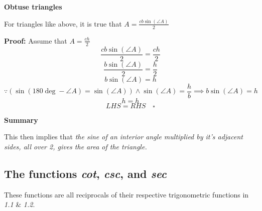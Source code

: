 \documentclass[a4paper, 12pt]{article}
\begin{document}
\begin{center}
	{\large \textbf{Obtuse triangles} } \bigbreak


\end{center}
For triangles like above, it is true that {\Large $A = \frac{cb\sin(\angle{A})}{2}$}

\begin{center}
	\textbf{Proof:}
	Assume that $A = \frac{ch}{2}$ \\
	$$\frac{cb\sin(\angle{A})}{2} = \frac{ch}{2}$$
	$$\frac{b\sin(\angle{A})}{2} = \frac{h}{2}$$
	$$b\sin(\angle{A}) = h$$
	$$\because (\sin(180\deg - \angle{A}) = \sin(\angle{A})) \land \sin(\angle{A}) = \frac{h}{b} \implies b\sin(\angle{A}) = h$$
	$$h = h$$
	$$LHS = RHS \quad \square$$
\end{center}
\newpage



{\large \textbf{Summary}} \bigbreak

This then implies that \emph{the sine of an interior angle multiplied by it's adjacent sides, all over 2, gives the area of the triangle.}

\subsection{The functions \emph{cot}, \emph{csc}, and \emph{sec}}
These functions are all reciprocals of their respective trigonometric functions in \emph{1.1} \& \emph{1.2}.
\end{document}
